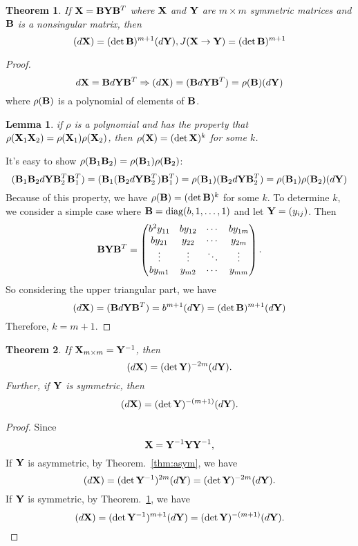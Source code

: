 \documentclass[11pt]{article}
\def\B{{\bf B}}
\def\X{{\bf X}}
\def\Y{{\bf Y}}
\def\diag{\mathrm{diag}}
\newtheorem{theorem}{Theorem}[section]
\newtheorem{lemma}{Lemma}[section]
\begin{document}
\begin{theorem} \label{thm:sym}
	If $\X=\B\Y\B^T$ where $\X$ and $\Y$ are $m\times m$ symmetric matrices and $\B$ is a nonsingular matrix, then
	\begin{equation}
		(d\X) = (\det\B)^{m+1}(d\Y),
		J(\X\rightarrow\Y) = (\det\B)^{m+1}
	\end{equation}
\end{theorem}
\begin{proof}
	\begin{equation}
		d\X = \B d\Y\B^T \Rightarrow (d\X) = (\B d\Y\B^T) = \rho(\B)(d\Y)
	\end{equation}
	where $\rho(\B)$ is a polynomial of elements of $\B$.
	\begin{lemma}
		if $\rho$ is a polynomial and has the property that $\rho(\X_1\X_2) = \rho(\X_1)\rho(\X_2)$, then $\rho(\X)=(\det \X)^k$ for some $k$.
	\end{lemma}
	It's easy to show $\rho(\B_1\B_2)=\rho(\B_1)\rho(\B_2)$:
	\begin{equation}
		(\B_1\B_2d\Y\B_2^T\B_1^T) = (\B_1(\B_2d\Y\B_2^T)\B_1^T) = \rho(\B_1)(\B_2d\Y\B_2^T) = \rho(\B_1)\rho(\B_2) (d\Y)
	\end{equation}
	Because of this property, we have $\rho(\B) = (\det\B)^k $ for some $k$.
	To determine $k$, we consider a simple case where $\B = \diag(b,1,\dots,1)$ and let $\Y = (y_{ij})$. Then
	$$ \B\Y\B^T =
		\begin{pmatrix}
			b^2y_{11}	& b y_{12}	& \cdots 	& b y_{1m}\\
			b y_{21}	& y_{22}	& \cdots 	& y_{2m}\\
			\vdots 	& \vdots 	& \ddots 	& \vdots \\
			b y_{m1} 	& y_{m2} 	& \cdots 	& y_{mm}\\
		\end{pmatrix}.
	$$
	So considering the upper triangular part, we have
	$$(d\X) = (\B d\Y\B^T) = b^{m+1}(d\Y) = (\det\B)^{m+1}(d\Y)$$
	Therefore, $k = m+1$.
\end{proof}

\begin{theorem}
	If $\X_{m\times m} = \Y^{-1}$, then 
		$$(d\X) = (\det\Y)^{-2m}(d\Y).$$
	Further, if $\Y$ is symmetric, then 
		$$(d\X) = (\det\Y)^{-(m+1)}(d\Y).$$
\end{theorem}
\begin{proof}
	Since 
		$$\X = \Y^{-1}\Y\Y^{-1},$$
	If $\Y$ is asymmetric, by Theorem.~\ref{thm:asym}, we have
		$$(d\X) = (\det\Y^{-1})^{2m}(d\Y) = (\det\Y)^{-2m}(d\Y).$$
	If $\Y$ is symmetric, by Theorem.~\ref{thm:sym}, we have
		$$(d\X) = (\det\Y^{-1})^{m+1}(d\Y) = (\det\Y)^{-(m+1)}(d\Y).$$
\end{proof}
\end{document}
